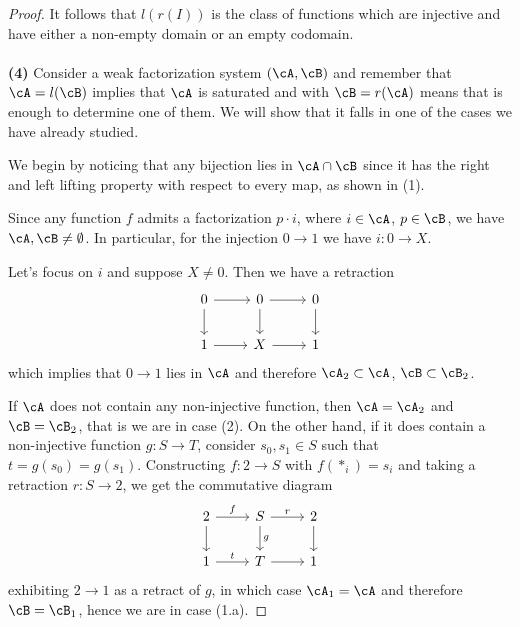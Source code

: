 \documentclass[a4paper,11pt,openany]{scrartcl}
\begin{document}
\begin{proof}
    It follows that $l(r(I))$ is the class of functions which are
    injective and have either a non-empty domain or an empty codomain.\\
    \\
     \textbf{(4)} Consider a weak factorization system $(\cA,\cB)$ and remember that
    $\cA=l(\cB)$ implies that $\cA$ is saturated and with $\cB=r(\cA)$ means
    that is enough to determine one of them. We will show that it
    falls in one of the cases we have already studied.

    We begin by noticing that any bijection
    lies in $\cA\cap\cB$ since it has the right and left lifting property with
    respect to every map, as shown in (1).

    Since any function $f$ admits a factorization
    $p\cdot i$, where $i\in\cA$, $p\in\cB$, we have $\cA,\cB\neq\emptyset$. In
    particular, for the injection $0\rightarrow 1$ we have $i\colon 0\rightarrow
    X$.

    Let's focus on $i$ and suppose $X\neq 0$. Then we have a retraction
    \[\begin{tikzcd}
	{0} & {0} & {0} \\
	{1} & {X} & {1}
	\arrow[from=1-1, to=1-2]
	\arrow[from=1-2, to=1-3]
	\arrow[from=1-1, to=2-1]
	\arrow[from=1-2, to=2-2]
	\arrow[from=1-3, to=2-3]
	\arrow[from=2-2, to=2-3]
	\arrow[from=2-1, to=2-2]
    \end{tikzcd}\]
    which implies that $0\rightarrow 1$ lies in $\cA$ and therefore
    $\cA_2\subset\cA$, $\cB\subset\cB_2$.

    If $\cA$ does not contain any non-injective function, then $\cA=\cA_2$ and
    $\cB=\cB_2$, that is we are in case (2). On the other hand, if it does
    contain a non-injective function
    $g\colon S\rightarrow T$, consider $s_0,s_1\in S$ such that
    $t=g(s_0)=g(s_1)$. Constructing $f\colon 2\rightarrow S$ with $f(*_i)=s_i$
    and taking a retraction $r\colon S\rightarrow 2$, we get the commutative
    diagram
    \[\begin{tikzcd}
	{2} & {S} & {2} \\
	{1} & {T} & {1}
	\arrow["f", from=1-1, to=1-2]
	\arrow["r", from=1-2, to=1-3]
	\arrow[from=1-1, to=2-1]
	\arrow["g", from=1-2, to=2-2]
	\arrow[from=1-3, to=2-3]
	\arrow[from=2-2, to=2-3]
	\arrow["t", from=2-1, to=2-2]
    \end{tikzcd}\]
    exhibiting $2\rightarrow 1$ as a retract of $g$, in which case $\cA_1=\cA$
    and therefore $\cB=\cB_1$, hence we are in case (1.a).


\end{proof}
\end{document}
